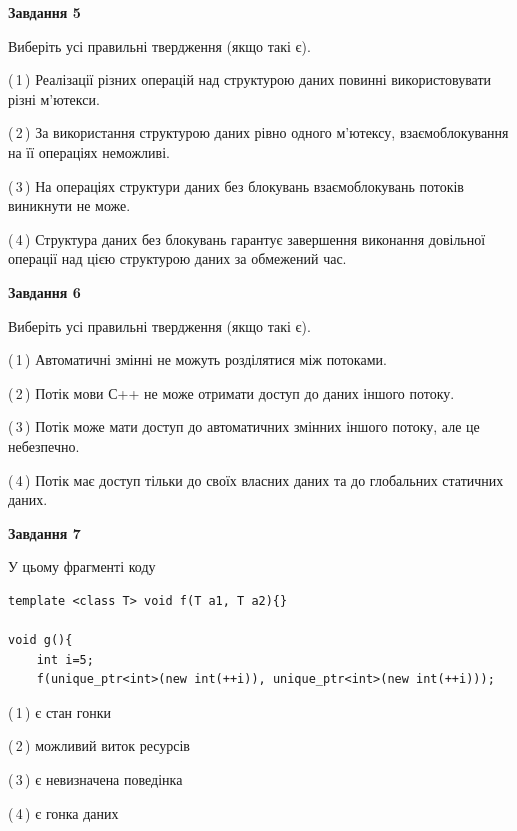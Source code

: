 \documentclass[12pt, ukrainian]{article}
\begin{document}
\begin {large}
{\begin{center}
\textbf{Завдання 5}
\end{center}

Виберіть усі правильні твердження (якщо такі є).\par
\vspace{2mm}

(\,1\,) Реалізації різних операцій над структурою даних повинні використовувати різні м’ютекси.%

(\,2\,) За використання структурою даних рівно одного м’ютексу, взаємоблокування на її операціях неможливі.%

(\,3\,) На операціях структури даних без блокувань взаємоблокувань потоків виникнути не може.%

(\,4\,) Структура даних без блокувань гарантує завершення виконання довільної операції над цією структурою даних за обмежений час.%
\newpage


\begin{center}
\textbf{Завдання 6}
\end{center}

Виберіть усі правильні твердження (якщо такі є).\par
\vspace{2mm}

(\,1\,) Автоматичні змінні не можуть розділятися між потоками.%

(\,2\,) Потік мови С++ не може отримати доступ до даних іншого потоку.%

(\,3\,) Потік може мати доступ до автоматичних змінних іншого потоку, але це небезпечно.%

(\,4\,) Потік має доступ тільки до своїх власних даних та до глобальних статичних даних.%


\begin{center}
\textbf{Завдання 7}
\end{center}

У цьому фрагменті коду
\begin{verbatim}
template <class T> void f(T a1, T a2){}

void g(){
    int i=5;
    f(unique_ptr<int>(new int(++i)), unique_ptr<int>(new int(++i)));
\end{verbatim}

(\,1\,) є стан гонки%

(\,2\,) можливий виток ресурсів%

(\,3\,) є невизначена поведінка%

(\,4\,) є гонка даних%

}
\end {large}

\vspace{4mm}
\newpage
\end{document}
